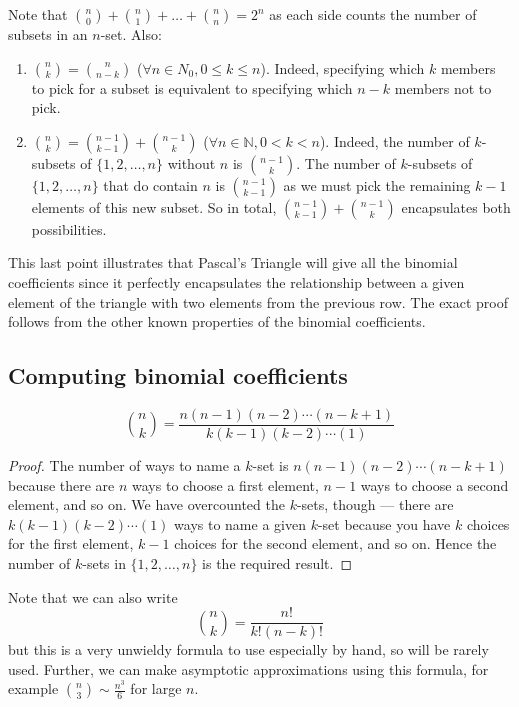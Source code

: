 Note that \(\binom{n}{0} + \binom{n}{1} + \dots + \binom{n}{n} = 2^n\) as each side counts the number of subsets in an \(n\)-set.
Also:
\begin{enumerate}
	\item \(\binom{n}{k} = \binom{n}{n-k}\) (\(\forall n \in N_0, 0 \leq k \leq n\)).
	      Indeed, specifying which \(k\) members to pick for a subset is equivalent to specifying which \(n-k\) members not to pick.
	\item \(\binom{n}{k} = \binom{n-1}{k-1} + \binom{n-1}{k}\) (\(\forall n \in \mathbb N, 0 < k < n\)).
	      Indeed, the number of \(k\)-subsets of \(\{ 1, 2, \dots, n \}\) without \(n\) is \(\binom{n-1}{k}\).
	      The number of \(k\)-subsets of \(\{ 1, 2, \dots, n \}\) that do contain \(n\) is \(\binom{n-1}{k-1}\) as we must pick the remaining \(k-1\) elements of this new subset.
	      So in total, \(\binom{n-1}{k-1} + \binom{n-1}{k}\) encapsulates both possibilities.
\end{enumerate}
This last point illustrates that Pascal's Triangle will give all the binomial coefficients since it perfectly encapsulates the relationship between a given element of the triangle with two elements from the previous row.
The exact proof follows from the other known properties of the binomial coefficients.

\subsection{Computing binomial coefficients}
\begin{proposition}
	\[
		\binom{n}{k} = \frac{n(n-1)(n-2)\cdots(n-k+1)}{k(k-1)(k-2)\cdots(1)}
	\]
\end{proposition}
\begin{proof}
	The number of ways to name a \(k\)-set is \(n(n-1)(n-2)\cdots(n-k+1)\) because there are \(n\) ways to choose a first element, \(n-1\) ways to choose a second element, and so on.
	We have overcounted the \(k\)-sets, though --- there are \(k(k-1)(k-2)\cdots(1)\) ways to name a given \(k\)-set because you have \(k\) choices for the first element, \(k-1\) choices for the second element, and so on.
	Hence the number of \(k\)-sets in \(\{ 1, 2, \dots, n \}\) is the required result.
\end{proof}
Note that we can also write
\[
	\binom{n}{k} = \frac{n!}{k!(n-k)!}
\]
but this is a very unwieldy formula to use especially by hand, so will be rarely used.
Further, we can make asymptotic approximations using this formula, for example \(\binom{n}{3} \sim \frac{n^3}{6}\) for large \(n\).

